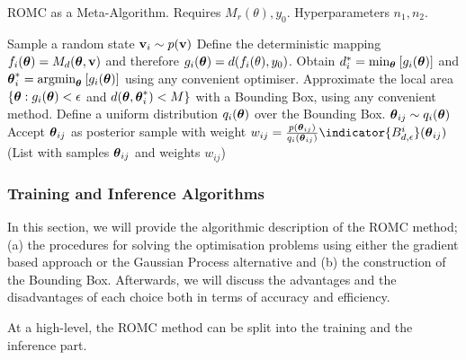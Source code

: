 \begin{algorithm}[t]
	\caption{ROMC as a Meta-Algorithm. Requires $M_r(\theta), y_0$. Hyperparameters $n_1,n_2$.}\label{alg:meta_alg}
	\begin{algorithmic}[1]
    \State Sample a random state $\mathbf{v}_i \sim p(\mathbf{v})$
		\State Define the deterministic mapping $f_i(\boldsymbol{\theta}) = M_d(\boldsymbol{\theta}, \mathbf{v})$ and therefore $g_i(\boldsymbol{\theta}) = d(f_i(\theta), y_0)$.
    \State Obtain $d_i^* = \text{min}_{\boldsymbol{\theta}} \: [g_i(\boldsymbol{\theta})]$ and $\boldsymbol{\theta}_i^* = \text{argmin}_{\boldsymbol{\theta}}\: [g_i(\boldsymbol{\theta})]$ using any convenient optimiser. \label{algstep:optimise}
    \State Approximate the local area $\{ \boldsymbol{\theta} : g_i(\boldsymbol{\theta}) < \epsilon$ and $d(\boldsymbol{\theta}, \boldsymbol{\theta}_i^*) < M \}$ with a Bounding Box, using any convenient method. \label{algstep:bounding_box}
		\State Define a uniform distribution $q_i(\boldsymbol{\theta})$ over the Bounding Box.
			\State $\boldsymbol{\theta}_{ij} \sim q_i(\boldsymbol{\theta})$
			\State Accept $\boldsymbol{\theta}_{ij}$ as posterior sample with weight $w_{ij} = \frac{p(\thetabij)}{q_i(\thetabij)} \indicator{\regioni} (\thetabij)$
			\EndFor
      \EndFor
     \Return(List with samples $\boldsymbol{\theta}_{ij}$ and weights $w_{ij}$) 
	\end{algorithmic}
\end{algorithm}


\subsubsection{Training and Inference Algorithms}
\label{subsubsec:alg-training-inference}

In this section, we will provide the algorithmic description of the
ROMC method; (a) the procedures for solving the optimisation problems
using either the gradient based approach or the Gaussian Process
alternative and (b) the construction of the Bounding Box. Afterwards,
we will discuss the advantages and the disadvantages of each choice
both in terms of accuracy and efficiency.

\noindent
At a high-level, the ROMC method can be split into the training and
the inference part.

